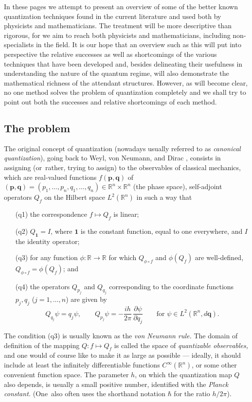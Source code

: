 \documentclass[12pt]{amsart}
\numberwithin{equation}{section}
\theoremstyle{remark}
\let\boldkey\mathbf \let\bold\mathbf
\newcommand\jedna{{\boldkey1}}
\newcommand\RR{\mathbb R}
\newcommand{\bp}{\mathbf p}
\newcommand{\bq}{\mathbf q}
\begin{document}
   In these pages we attempt to present an overview of some of the better known
quantization techniques found in the current literature and used both by
physicists and mathematicians. The treatment will be more descriptive than
rigorous, for we aim to reach both physicists and mathematicians, including
non-specialists in the field. It is our hope that an overview such as this will
put into perspective the relative successes as well as shortcomings of the various
techniques that have been developed and,  besides delineating  their usefulness
in understanding the nature of the quantum regime, will also demonstrate
the mathematical richness of the attendant structures. However, as will become clear,
no one method solves the problem of quantization completely and we shall
try to point out both the successes and relative shortcomings of each method.


\subsection{The problem}

The original concept of quantization (nowadays usually referred to as
{\it canonical quantization}), going back to Weyl, von Neumann, and Dirac
 \cite{bib:Dirac} \cite{bib:vNeu} \cite{bib:WeyGrleh}, consists in assigning
(or~rather, trying to assign) to the observables of  classical mechanics, which
are real-valued functions $f(\bp,\bq)$ of $(\bp,\bq)=(p_1,\dots,p_n,q_1,\dots,
q_n)\in\RR^n\times\RR^n$ (the phase space),  self-adjoint operators $Q_f$ on
the Hilbert space $L^2(\RR^n)$ in such a way that
\begin{enumerate}
\item[(q1)] the correspondence $f\mapsto Q_f$ is linear;
\item[(q2)] $Q_\jedna=I$, where $\jedna$ is the constant function, equal to one
everywhere, and $I$ the identity operator;
\item[(q3)] for any function $\phi:\RR\to\RR$ for which $Q_{\phi\circ f}$ and
$\phi(Q_f)$ are well-defined,
$Q_{\phi\circ f}=\phi(Q_f)$; and
\item[(q4)] the operators $Q_{p_j}$ and $Q_{q_j}$ corresponding to the
coordinate functions $p_j,q_j$ ($j=1,\dots,n$) are given by
\begin{equation}  Q_{q_j} \psi = q_j \psi,
\qquad Q_{p_j} \psi =-\frac{ih}{2\pi} \,\frac{\partial \psi} {\partial q_j}
\qquad \text{for } \psi \in L^2(\RR^n,d\bq).
\label{tag:Schro}  \end{equation}
\end{enumerate}
The condition (q3) is usually known as the {\it von Neumann rule.\/}
The domain of definition of the mapping $Q:f\mapsto Q_f$ is called the space of
{\it quantizable observables,\/} and one would of course like to make it as
large as possible --- ideally, it should include at least the
infinitely differentiable functions $C^\infty(\RR^n)$, or
some other convenient function space. The parameter $h$, on which the
quantization map $Q$ also depends, is usually a small positive number,
identified with the {\it Planck constant.}
(One~also often uses the shorthand notation $\hbar$ for the ratio $h/2\pi$).
\end{document}
